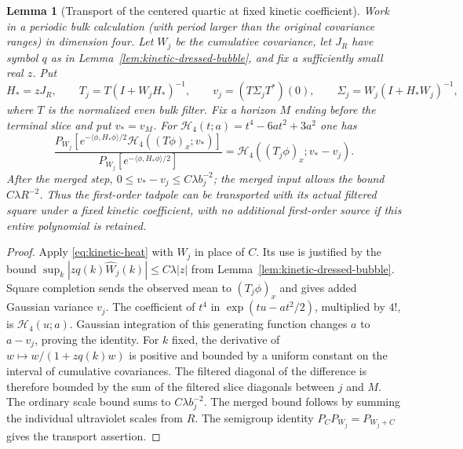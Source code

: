 \documentclass[11pt]{article}
\newtheorem{lemma}[theorem]{Lemma}
\theoremstyle{definition}
\begin{document}
\begin{lemma}[Transport of the centered quartic at fixed kinetic coefficient]
\label{lem:kinetic-wick}
Work in a periodic bulk calculation (with period larger than the
original covariance ranges) in dimension four. Let \(W_j\) be the
cumulative covariance, let \(J_R\) have symbol \(q\) as in
Lemma~\ref{lem:kinetic-dressed-bubble}, and fix a sufficiently
small real \(z\). Put
\begin{equation}
 H_*=zJ_R,\qquad
 T_j=T(I+W_jH_*)^{-1},\qquad
 v_j=(T\Sigma_j T^*)(0),\qquad
 \Sigma_j=W_j(I+H_*W_j)^{-1},
\end{equation}
where \(T\) is the normalized even bulk filter. Fix a horizon \(M\)
ending before the terminal slice and put \(v_*=v_M\).
For \(\mathcal H_4(t;a)=t^4-6at^2+3a^2\) one has
\begin{equation}
 \frac{P_{W_j}\left[e^{-\langle\phi,H_*\phi\rangle/2}
               \mathcal H_4((T\phi)_x;v_*)\right]}
      {P_{W_j}\left[e^{-\langle\phi,H_*\phi\rangle/2}\right]}
     =\mathcal H_4((T_j\phi)_x;v_*-v_j).
\end{equation}
After the merged step,
\(0\le v_*-v_j\le C\lambda b_j^{-2}\); the merged input
allows the bound \(C\lambda R^{-2}\). Thus the first-order
tadpole can be transported with its actual filtered square
under a fixed kinetic coefficient, with no additional
first-order source if this entire polynomial is retained.
\end{lemma}

\begin{proof}
Apply \eqref{eq:kinetic-heat} with \(W_j\) in place of \(C\). Its use is justified by
the bound
\(\sup_k |zq(k)\widehat W_j(k)|\le C\lambda|z|\) from
Lemma~\ref{lem:kinetic-dressed-bubble}. Square completion sends the observed mean
to \((T_j\phi)_x\) and gives added Gaussian variance \(v_j\).
The coefficient of \(t^4\) in
\(\exp(tu-at^2/2)\), multiplied by \(4!\), is
\(\mathcal H_4(u;a)\). Gaussian integration of this generating
function changes \(a\) to \(a-v_j\), proving the identity.
For \(k\) fixed, the derivative of
\(w\mapsto w/(1+zq(k)w)\) is positive and bounded by a uniform
constant on the interval of cumulative covariances. The filtered
diagonal of the difference is therefore bounded by the sum of
the filtered slice diagonals between \(j\) and \(M\).
The ordinary scale bound sums to \(C\lambda b_j^{-2}\).
The merged bound follows by summing the individual ultraviolet
scales from \(R\). The semigroup identity
\(P_C P_{W_j}=P_{W_j+C}\) gives the transport assertion.
\end{proof}
\end{document}
